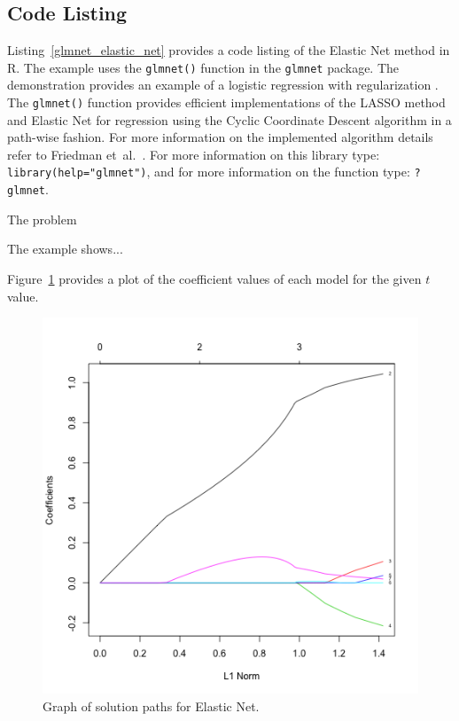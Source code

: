 \subsection{Code Listing}
Listing~\ref{glmnet_elastic_net} provides a code listing of the Elastic Net method in R.
The example uses the \texttt{glmnet()} function in the \texttt{glmnet} package. The demonstration provides an example of a logistic regression with regularization \cite{Friedman2011}. The \texttt{glmnet()} function provides efficient implementations of the LASSO method and Elastic Net for regression using the Cyclic Coordinate Descent algorithm in a path-wise fashion. For more information on the implemented algorithm details refer to Friedman et~al.\ \cite{Friedman2010}. For more information on this library type: \texttt{library(help="glmnet")}, and for more information on the function type: \texttt{?glmnet}.

The problem

The example shows...

Figure~\ref{plot:elastic_net_result} provides a plot of the coefficient values of each model for the given $t$ value.



\begin{figure}[htp]
\centering
\includegraphics[scale=0.60]{book/a_regularization/elastic_net_result.png}
\caption{Graph of solution paths for Elastic Net.}
\label{plot:elastic_net_result}
\end{figure}

